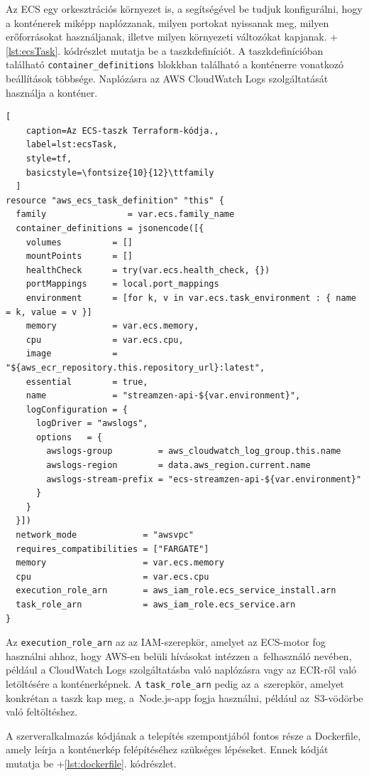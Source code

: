 Az ECS egy orkesztrációs környezet is, a segítségével be tudjuk konfigurálni, hogy a konténerek miképp naplózzanak, milyen portokat nyissanak meg, milyen erőforrásokat használjanak, illetve milyen környezeti változókat kapjanak. \Az+\ref{lst:ecsTask}. kódrészlet mutatja be a taszkdefiníciót. A taszkdefinícióban található \verb|container_definitions| blokkban található a konténerre vonatkozó beállítások többsége. Naplózásra az AWS CloudWatch Logs szolgáltatását használja a konténer.

\begin{minipage}{0.92\textwidth}
  \begin{lstlisting}[
    caption=Az ECS-taszk Terraform-kódja.,
    label=lst:ecsTask,
    style=tf,
    basicstyle=\fontsize{10}{12}\ttfamily
  ]
resource "aws_ecs_task_definition" "this" {
  family                = var.ecs.family_name
  container_definitions = jsonencode([{
    volumes          = []
    mountPoints      = []
    healthCheck      = try(var.ecs.health_check, {})
    portMappings     = local.port_mappings
    environment      = [for k, v in var.ecs.task_environment : { name = k, value = v }]
    memory           = var.ecs.memory,
    cpu              = var.ecs.cpu,
    image            = "${aws_ecr_repository.this.repository_url}:latest",
    essential        = true,
    name             = "streamzen-api-${var.environment}",
    logConfiguration = {
      logDriver = "awslogs",
      options   = {
        awslogs-group         = aws_cloudwatch_log_group.this.name
        awslogs-region        = data.aws_region.current.name
        awslogs-stream-prefix = "ecs-streamzen-api-${var.environment}"
      }
    }
  }])
  network_mode             = "awsvpc"
  requires_compatibilities = ["FARGATE"]
  memory                   = var.ecs.memory
  cpu                      = var.ecs.cpu
  execution_role_arn       = aws_iam_role.ecs_service_install.arn
  task_role_arn            = aws_iam_role.ecs_service.arn
}
\end{lstlisting}
\end{minipage}

Az \verb|execution_role_arn| az az IAM-szerepkör, amelyet az ECS-motor fog használni ahhoz, hogy AWS-en belüli hívásokat intézzen a~felhasználó nevében, például a CloudWatch Logs szolgáltatásba való naplózásra vagy az ECR-ről való letöltésére a konténerképnek. A \verb|task_role_arn| pedig az a~szerepkör, amelyet konkrétan a taszk kap meg, a~Node.js-app fogja használni, például az~S3-vödörbe való feltöltéshez.

A szerveralkalmazás kódjának a telepítés szempontjából fontos része a Dockerfile, amely leírja a konténerkép felépítéséhez szükséges lépéseket. Ennek kódját mutatja be \az+\ref{lst:dockerfile}. kódrészlet.

